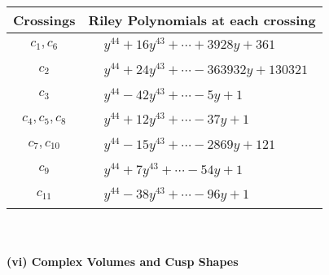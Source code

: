 \documentclass[1p]{elsarticle_modified}
\theoremstyle{definition}
\begin{document}
\begin{tabular}{m{50pt}|m{274pt}}
Crossings & \hspace{64pt}Riley Polynomials at each crossing \\
\hline $$\begin{aligned}c_{1},c_{6}\end{aligned}$$&$\begin{aligned}
&y^{44}+16 y^{43}+\cdots+3928 y+361
\end{aligned}$\\
\hline $$\begin{aligned}c_{2}\end{aligned}$$&$\begin{aligned}
&y^{44}+24 y^{43}+\cdots-363932 y+130321
\end{aligned}$\\
\hline $$\begin{aligned}c_{3}\end{aligned}$$&$\begin{aligned}
&y^{44}-42 y^{43}+\cdots-5 y+1
\end{aligned}$\\
\hline $$\begin{aligned}c_{4},c_{5},c_{8}\end{aligned}$$&$\begin{aligned}
&y^{44}+12 y^{43}+\cdots-37 y+1
\end{aligned}$\\
\hline $$\begin{aligned}c_{7},c_{10}\end{aligned}$$&$\begin{aligned}
&y^{44}-15 y^{43}+\cdots-2869 y+121
\end{aligned}$\\
\hline $$\begin{aligned}c_{9}\end{aligned}$$&$\begin{aligned}
&y^{44}+7 y^{43}+\cdots-54 y+1
\end{aligned}$\\
\hline $$\begin{aligned}c_{11}\end{aligned}$$&$\begin{aligned}
&y^{44}-38 y^{43}+\cdots-96 y+1
\end{aligned}$\\
\hline
\end{tabular}\\~\\
\newpage\flushleft \textbf{(vi) Complex Volumes and Cusp Shapes}
\end{document}
